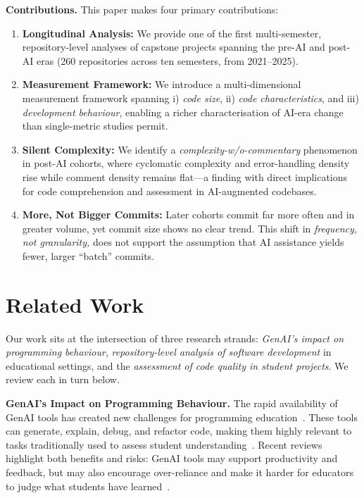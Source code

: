 \documentclass[sigconf,authorversion]{acmart}
\newcommand{\todo}[1]{#1}
\begin{document}
\textbf{Contributions.}
This paper makes four primary contributions:
\begin{enumerate}[leftmargin=*,topsep=0pt]
    \item \textbf{Longitudinal Analysis:} We provide one of the first multi-semester, repository-level analyses of capstone projects spanning the pre-AI and post-AI eras (260 repositories across ten semesters, from 2021--2025).
    \item \textbf{Measurement Framework:} We introduce a multi-dimensional measurement framework spanning i) \emph{code size}, ii) \emph{code characteristics}, and iii) \emph{development behaviour}, enabling a richer characterisation of AI-era change than single-metric studies permit.
    \item \textbf{Silent Complexity:} We identify a \emph{complexity-w/o-commentary} phenomenon in post-AI cohorts, where cyclomatic complexity and error-handling density rise while comment density remains flat---a finding with direct implications for code comprehension and assessment in AI-augmented codebases.
    \item \textbf{More, Not Bigger Commits:} \todo{Later cohorts commit far more often and in greater volume, yet commit size shows no clear trend. This shift in \emph{frequency, not granularity,} does not support the assumption that AI assistance yields fewer, larger ``batch'' commits.}
\end{enumerate}
%

\section {Related Work}
Our work sits at the intersection of three research strands: \emph{GenAI's impact on programming behaviour}, \emph{repository-level analysis of software development} in educational settings, and the \emph{assessment of code quality in student projects}. We review each in turn below.

\textbf{GenAI's Impact on Programming Behaviour.}
The rapid availability of GenAI tools has created new challenges for programming education~\cite{prather2023robots}. These tools can generate, explain, debug, and refactor code, making them highly relevant to tasks traditionally used to assess student understanding~\cite{bouvier2025rest}. Recent reviews highlight both benefits and risks: GenAI tools may support productivity and feedback, but may also encourage over-reliance and make it harder for educators to judge what students have learned~\cite{nathaniel2025literature, shen2026ai}.
\end{document}
